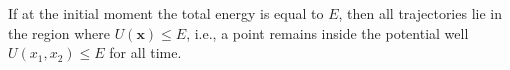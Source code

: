 If at the initial moment the total energy is equal to $E$, then all trajectories lie in the region where $U(\mathbf{x}) \leq E$, i.e., a point remains inside the potential well $U(x_1, x_2) \leq E$ for all time.
